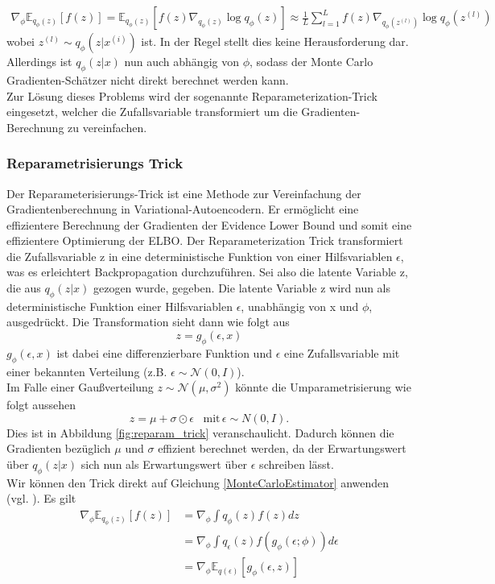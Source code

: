 \documentclass[%
thesis=student,%
coverpage=false,%
titlepage=false,%
headmarks=true, %
german,%
font=libertine, %
math=newpxtx, %
BCOR=5mm,%
coverBCOR=11mm%
]{tumbook}
\theoremstyle{break}
\begin{document}
\begin{align}
 \nabla_\phi \mathbb{E}_{q_\phi(z)}[f(z)]= \mathbb{E}_{q_\phi(z)}[f(z)\nabla_{q_\phi(z)}\log q_\phi(z)] \approx \frac{1}{L} \sum_{l=1}^{L}f(z)\nabla_{q_\phi(z^{(l)})}\log q_\phi(z^{(l)}) \label{MonteCarloEstimator}
\end{align}
wobei $z^{(l)} \sim q_\phi(z|x^{(i)})$ ist. 
In der Regel stellt dies keine Herausforderung dar. Allerdings ist $q_\phi(z|x)$ nun auch abhängig von  $\phi$, sodass der Monte Carlo Gradienten-Schätzer nicht direkt berechnet werden kann. \\
Zur Lösung dieses Problems wird der sogenannte Reparameterization-Trick eingesetzt, welcher die Zufallsvariable transformiert um die Gradienten-Berechnung zu vereinfachen.  
\subsubsection{Reparametrisierungs Trick}
Der Reparameterisierungs-Trick ist eine Methode zur Vereinfachung der Gradientenberechnung in Variational-Autoencodern. Er ermöglicht eine effizientere Berechnung der Gradienten der Evidence Lower Bound und somit eine effizientere Optimierung der ELBO. Der Reparameterization Trick transformiert die Zufallsvariable z in eine deterministische Funktion von einer Hilfsvariablen $\epsilon$, was es erleichtert Backpropagation durchzuführen.
Sei also die latente Variable z, die aus $q_\phi(z|x)$ gezogen wurde, gegeben. Die latente Variable z wird nun als deterministische Funktion einer Hilfsvariablen $\epsilon$, unabhängig von x und $\phi$, ausgedrückt. 
Die Transformation sieht dann wie folgt aus
$$ z = g_\phi(\epsilon, x)$$
$g_\phi(\epsilon,x) $ ist dabei eine differenzierbare Funktion und $\epsilon$ eine Zufallsvariable mit einer bekannten Verteilung (z.B. $\epsilon \sim \mathcal{N}(0,I)$).\\
Im Falle einer Gaußverteilung $z \sim \mathcal{N}(\mu, \sigma^2)$ könnte die Umparametrisierung wie folgt aussehen 
$$z=\mu + \sigma \odot \epsilon \hspace{10pt}\text{mit} \hspace{2pt} \epsilon\sim N(0,I).$$ Dies ist in  Abbildung \ref{fig:reparam_trick} veranschaulicht.
Dadurch können die Gradienten bezüglich $\mu$ und $\sigma$ effizient berechnet werden, da der Erwartungswert über $q_\phi(z|x)$ sich nun als Erwartungswert über $\epsilon$ schreiben lässt.
\\
Wir können den Trick direkt auf Gleichung \ref{MonteCarloEstimator} anwenden (vgl. \cite{MonteCarloEstimation}). Es gilt
\begin{align}
	 \nabla_\phi \mathbb{E}_{q_\phi(z)}[f(z)] &= \nabla_\phi \int q_\phi(z) f(z) dz \\
	 &= \nabla_\phi \int q_\epsilon(z) f(g_\phi(\epsilon;\phi)) d\epsilon \\
	 &= \nabla_\phi \mathbb{E}_{q(\epsilon)}[g_\phi(\epsilon,z)]
\end{align}
\end{document}
